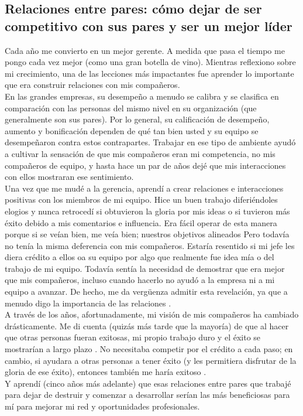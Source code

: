 \documentclass[10pt]{book}
\begin{document}
\subsection{Relaciones entre pares: cómo dejar de ser competitivo con sus pares y ser un mejor líder}
Cada año me convierto en un mejor gerente. A medida que pasa el tiempo me pongo cada vez mejor (como una gran botella de vino). Mientras reflexiono sobre mi crecimiento, una de las lecciones más impactantes fue aprender lo importante que era construir relaciones con mis compañeros.\\
En las grandes empresas, su desempeño a menudo se calibra y se clasifica en comparación con las personas del mismo nivel en su organización (que generalmente son sus pares). Por lo general, su calificación de desempeño, aumento y bonificación dependen de qué tan bien usted y su equipo se desempeñaron contra estos contrapartes. Trabajar en ese tipo de ambiente ayudó a cultivar la sensación de que mis compañeros eran mi competencia, no mis compañeros de equipo, y hasta hace un par de años dejé que mis interacciones con ellos mostraran ese sentimiento.\\
Una vez que me mudé a la gerencia, aprendí a crear relaciones e interacciones positivas con los miembros de mi equipo. Hice un buen trabajo diferiéndoles elogios y nunca retrocedí si obtuvieron la gloria por mis ideas o si tuvieron más éxito debido a mis comentarios e influencia. Era fácil operar de esta manera porque si se veían bien, me veía bien; nuestros objetivos alineados
Pero todavía no tenía la misma deferencia con mis compañeros. Estaría resentido si mi jefe les diera crédito a ellos oa su equipo por algo que realmente fue idea mía o del trabajo de mi equipo. Todavía sentía la necesidad de demostrar que era mejor que mis compañeros, incluso cuando hacerlo no ayudó a la empresa ni a mi equipo a avanzar. De hecho, me da vergüenza admitir esta revelación, ya que a menudo digo la importancia de las relaciones .\\
A través de los años, afortunadamente, mi visión de mis compañeros ha cambiado drásticamente. Me di cuenta (quizás más tarde que la mayoría) de que al hacer que otras personas fueran exitosas, mi propio trabajo duro y el éxito se mostrarían a largo plazo . No necesitaba competir por el crédito a cada paso; en cambio, si ayudara a otras personas a tener éxito (y les permitiera disfrutar de la gloria de ese éxito), entonces también me haría exitoso .\\
Y aprendí (cinco años más adelante) que esas relaciones entre pares que trabajé para dejar de destruir y comenzar a desarrollar serían las más beneficiosas para mí para mejorar mi red y oportunidades profesionales.\\
\end{document}
